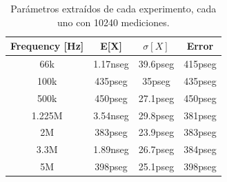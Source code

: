 \begin{table}[H]
     \centering
     \begin{tabular}{cccc}
     \hline
     Frequency {[}Hz{]} & E{[}X{]} & $ \sigma[X]$ & Error   \\ \hline
     66k                & 1.17nseg & 39.6pseg     & 415pseg \\ \hline
     100k               & 435pseg  & 35pseg       & 435pseg \\ \hline
     500k               & 450pseg  & 27.1pseg     & 450pseg \\ \hline
     1.225M             & 3.54nseg & 29.8pseg     & 381pseg \\ \hline
     2M                 & 383pseg  & 23.9pseg     & 383pseg \\ \hline
     3.3M               & 1.89nseg & 26.7pseg     & 384pseg \\ \hline
     5M                 & 398pseg  & 25.1pseg     & 398pseg \\ \hline
     \end{tabular}
     \caption{Parámetros extraídos de cada experimento, cada uno con 10240 mediciones.}
\end{table}
